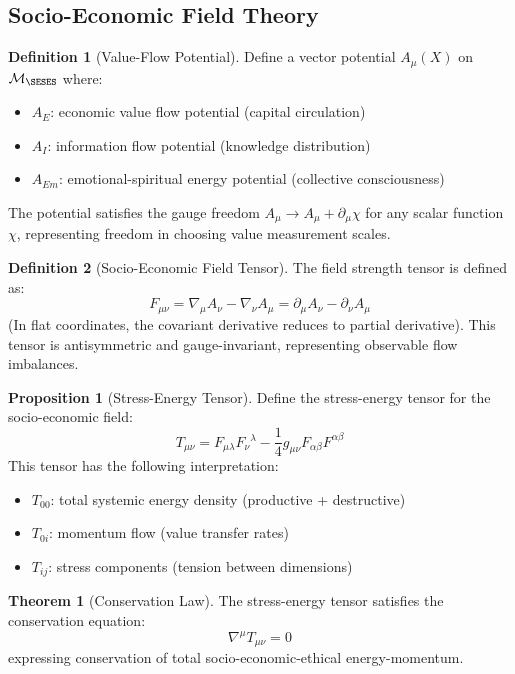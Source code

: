 \documentclass[11pt,a4paper]{article}
\theoremstyle{definition}
\newtheorem{definition}{Definition}[section]
\newtheorem{proposition}{Proposition}[section]
\newtheorem{theorem}{Theorem}[section]
\theoremstyle{remark}
\begin{document}
\subsection{Socio-Economic Field Theory}
\label{app:field_theory}

\begin{definition}[Value-Flow Potential]
Define a vector potential $A_\mu(X)$ on $\mathcal{M}_{\SESES}$ where:
\begin{itemize}[leftmargin=1.5em]
    \item $A_E$: economic value flow potential (capital circulation)
    \item $A_I$: information flow potential (knowledge distribution)
    \item $A_{Em}$: emotional-spiritual energy potential (collective consciousness)
\end{itemize}
The potential satisfies the gauge freedom $A_\mu \to A_\mu + \partial_\mu \chi$ for any scalar function $\chi$, representing freedom in choosing value measurement scales.
\end{definition}

\begin{definition}[Socio-Economic Field Tensor]
The field strength tensor is defined as:
\[
F_{\mu\nu} = \nabla_\mu A_\nu - \nabla_\nu A_\mu = \partial_\mu A_\nu - \partial_\nu A_\mu
\]
(In flat coordinates, the covariant derivative reduces to partial derivative). This tensor is antisymmetric and gauge-invariant, representing observable flow imbalances.
\end{definition}

\begin{proposition}[Stress-Energy Tensor]
Define the stress-energy tensor for the socio-economic field:
\[
T_{\mu\nu} = F_{\mu\lambda} F_\nu{}^\lambda - \frac{1}{4} g_{\mu\nu} F_{\alpha\beta} F^{\alpha\beta}
\]
This tensor has the following interpretation:
\begin{itemize}[leftmargin=1.5em]
    \item $T_{00}$: total systemic energy density (productive + destructive)
    \item $T_{0i}$: momentum flow (value transfer rates)
    \item $T_{ij}$: stress components (tension between dimensions)
\end{itemize}
\end{proposition}

\begin{theorem}[Conservation Law]
The stress-energy tensor satisfies the conservation equation:
\[
\nabla^\mu T_{\mu\nu} = 0
\]
expressing conservation of total socio-economic-ethical energy-momentum.
\end{theorem}
\end{document}
